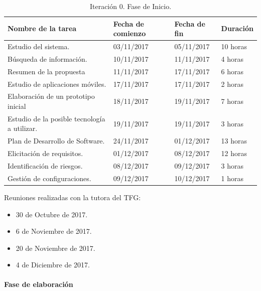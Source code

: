 \documentclass[twoside]{report}
\begin{document}
\begin{table}[H]
\centering
	\begin{tabular}{|l|l|l|l|}
    \hline
    Nombre de la tarea                           & Fecha de comienzo & Fecha de fin & Duración \\ \hline
    Estudio del sistema.                         & 03/11/2017        & 05/11/2017   & 10 horas  \\ \hline
    Búsqueda de información.                     & 10/11/2017        & 11/11/2017   & 4 horas   \\ \hline
    Resumen de la propuesta                      & 11/11/2017        & 17/11/2017   & 6 horas   \\ \hline
    Estudio de aplicaciones móviles.             & 17/11/2017        & 17/11/2017   & 2 horas   \\ \hline
    Elaboración de un prototipo inicial          & 18/11/2017        & 19/11/2017   & 7 horas   \\ \hline
    Estudio de la posible tecnología a utilizar. & 19/11/2017        & 19/11/2017   & 3 horas   \\ \hline
    Plan de Desarrollo de Software.              & 24/11/2017        & 01/12/2017   & 13 horas   \\ \hline
    Elicitación de requisitos.                   & 01/12/2017        & 08/12/2017   & 12 horas   \\ \hline
    Identificación de riesgos.                   & 08/12/2017        & 09/12/2017   & 3 horas   \\ \hline
    Gestión de configuraciones.                  & 09/12/2017        & 10/12/2017   & 1 horas   \\ \hline
    \end{tabular}
    \caption{Iteración 0. Fase de Inicio.}
\end{table}

Reuniones realizadas con la tutora del TFG:

\begin{itemize}
\item 30 de Octubre de 2017.
\item 6 de Noviembre de 2017.
\item 20 de Noviembre de 2017.
\item 4 de Diciembre de 2017.
\end{itemize}

\paragraph{Fase de elaboración}\mbox{}\\
\end{document}
